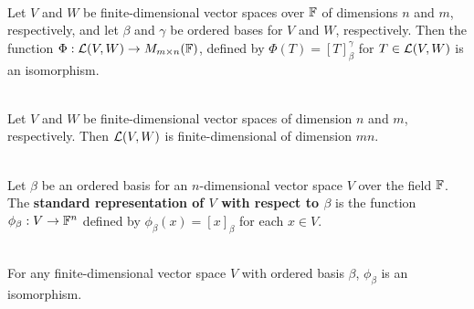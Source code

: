 \begin{theorem}
	\hfill\\
	Let $V$ and $W$ be finite-dimensional vector spaces over $\mathbb{F}$ of dimensions $n$ and $m$, respectively, and let $\beta$ and $\gamma$ be ordered bases for $V$ and $W$, respectively. Then the function $\Phi: \mathcal{L}(V,W) \to M_{m \times n}(\mathbb{F})$, defined by $\Phi(T) = [T]_\beta^\gamma$ for $T \in \mathcal{L}(V,W)$ is an isomorphism.
\end{theorem}

\begin{corollary}\label{Corollary 2.7}
	\hfill\\
	Let $V$ and $W$ be finite-dimensional vector spaces of dimension $n$ and $m$, respectively. Then $\mathcal{L}(V,W)$ is finite-dimensional of dimension $mn$.
\end{corollary}

\begin{definition}
	\hfill\\
	Let $\beta$ be an ordered basis for an $n$-dimensional vector space $V$ over the field $\mathbb{F}$. The \textbf{standard representation of $V$ with respect to $\beta$} is the function $\phi_\beta: V \to \mathbb{F}^n$ defined by $\phi_\beta(x) = [x]_\beta$ for each $x \in V$.
\end{definition}

\begin{theorem}
	\hfill\\
	For any finite-dimensional vector space $V$ with ordered basis $\beta$, $\phi_\beta$ is an isomorphism.
\end{theorem}

